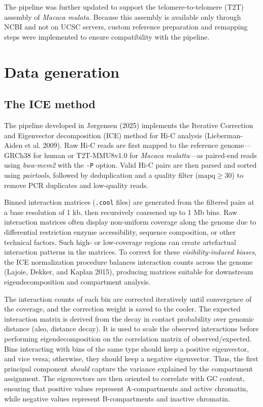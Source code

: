 \documentclass[
  10pt,
  a4paper,
  openany]{scrbook}
\begin{document}
The pipeline was further updated to support the telomere-to-telomere
(T2T) assembly of \emph{Macaca mulata}. Because this assembly is
available only through NCBI and not on UCSC servers, custom reference
preparation and remapping steps were implemented to ensure compatibility
with the pipeline.

\section{Data generation}\label{data-generation}

\subsection{The ICE method}\label{the-ice-method}

The pipeline developed in Jørgensen (2025) implements the Iterative
Correction and Eigenvector decomposition (ICE) method for Hi-C analysis
(Lieberman-Aiden et al. 2009). Raw Hi-C reads are first mapped to the
reference genome---GRCh38 for human or T2T-MMU8v1.0 for \emph{Macaca
mulatta}---as paired-end reads using \emph{bwa-mem2} with the
\texttt{-P} option. Valid Hi-C pairs are then parsed and sorted using
\emph{pairtools}, followed by deduplication and a quality filter
(\(\text{mapq} \geq 30\)) to remove PCR duplicates and low-quality
reads.

Binned interaction matrices (\texttt{.cool} files) are generated from
the filtered pairs at a base resolution of 1 kb, then recursively
coarsened up to 1 Mb bins. Raw interaction matrices often display
non-uniform coverage along the genome due to differential restriction
enzyme accessibility, sequence composition, or other technical factors.
Such high- or low-coverage regions can create artefactual interaction
patterns in the matrices. To correct for these \emph{visibility-induced
biases}, the ICE normalization procedure balances interaction counts
across the genome (Lajoie, Dekker, and Kaplan 2015), producing matrices
suitable for downstream eigendecomposition and compartment analysis.

The interaction counts of each bin are corrected iteratively until
convergence of the coverage, and the correction weight is saved to the
cooler. The expected interaction matrix is derived from the decay in
contact probability over genomic distance (also, distance decay). It is
used to scale the observed interactions before performing
eigendecomposition on the correlation matrix of observed/expected. Bins
interacting with bins of the same type should keep a positive
eigenvector, and vice versa; otherwise, they should keep a negative
eigenvector. Thus, the first principal component \emph{should} capture
the variance explained by the compartment assignment. The eigenvectors
are then oriented to correlate with GC content, ensuring that positive
values represent A-compartments and active chromatin, while negative
values represent B-compartments and inactive chromatin.
\end{document}
